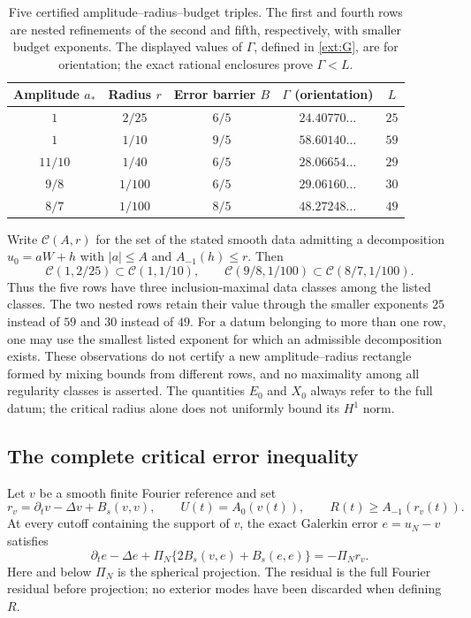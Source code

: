 \begin{table}[htbp]
\centering
\begin{tabular}{ccccc}
\hline
Amplitude $a_*$ & Radius $r$ & Error barrier $B$ & $\Gamma$ (orientation) & $L$\\
\hline
$1$ & $2/25$ & $6/5$ & $24.40770\ldots$ & $25$\\
$1$ & $1/10$ & $9/5$ & $58.60140\ldots$ & $59$\\
$11/10$ & $1/40$ & $6/5$ & $28.06654\ldots$ & $29$\\
$9/8$ & $1/100$ & $6/5$ & $29.06160\ldots$ & $30$\\
$8/7$ & $1/100$ & $8/5$ & $48.27248\ldots$ & $49$\\
\hline
\end{tabular}
\caption{Five certified amplitude--radius--budget triples. The first and
fourth rows are nested refinements of the second and fifth, respectively,
with smaller budget exponents. The displayed values of $\Gamma$, defined
in \eqref{ext:G}, are for orientation; the exact rational enclosures
prove $\Gamma<L$.}
\label{ext:regions}
\end{table}

Write $\mathcal C(A,r)$ for the set of the stated smooth data admitting a
decomposition $u_0=aW+h$ with $|a|\le A$ and $A_{-1}(h)\le r$. Then
\[
 \mathcal C(1,2/25)\subset\mathcal C(1,1/10),\qquad
 \mathcal C(9/8,1/100)\subset\mathcal C(8/7,1/100).
\]
Thus the five rows have three inclusion-maximal data classes among the
listed classes. The two nested rows retain their value through the
smaller exponents $25$ instead of $59$ and $30$ instead of $49$.
For a datum belonging to more than one row, one may use the smallest
listed exponent for which an admissible decomposition exists. These
observations do not certify a new amplitude--radius rectangle formed
by mixing bounds from different rows, and no maximality among all
regularity classes is asserted. The quantities $E_0$ and $X_0$ always
refer to the full datum; the critical radius alone does not uniformly
bound its $H^1$ norm.

\subsection{The complete critical error inequality}
\label{ext:comparison}

Let $v$ be a smooth finite Fourier reference and set
\[
 r_v=\partial_tv-\Delta v+B_s(v,v),\qquad
 U(t)=A_0(v(t)),\qquad R(t)\ge A_{-1}(r_v(t)).
\]
At every cutoff containing the support of $v$, the exact Galerkin error
$e=u_N-v$ satisfies
\[
 \partial_te-\Delta e+
 \Pi_N\{2B_s(v,e)+B_s(e,e)\}=-\Pi_Nr_v.
\]
Here and below $\Pi_N$ is the spherical projection. The residual is the full
Fourier residual before projection; no exterior modes have been discarded
when defining $R$.

